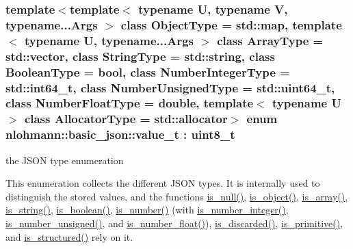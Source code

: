 \subsubsection[{value\+\_\+t}]{\setlength{\rightskip}{0pt plus 5cm}template$<$template$<$ typename U, typename V, typename...\+Args $>$ class Object\+Type = std\+::map, template$<$ typename U, typename...\+Args $>$ class Array\+Type = std\+::vector, class String\+Type  = std\+::string, class Boolean\+Type  = bool, class Number\+Integer\+Type  = std\+::int64\+\_\+t, class Number\+Unsigned\+Type  = std\+::uint64\+\_\+t, class Number\+Float\+Type  = double, template$<$ typename U $>$ class Allocator\+Type = std\+::allocator$>$ enum {\bf nlohmann\+::basic\+\_\+json\+::value\+\_\+t} \+: uint8\+\_\+t\hspace{0.3cm}{\ttfamily [strong]}}\label{classnlohmann_1_1basic__json_a231b02148577b69a154b2ce2c87a5522}


the J\+S\+O\+N type enumeration 

This enumeration collects the different J\+S\+O\+N types. It is internally used to distinguish the stored values, and the functions \hyperlink{classnlohmann_1_1basic__json_a685d9d6a8a45bfcb8455b147257cdffb}{is\+\_\+null()}, \hyperlink{classnlohmann_1_1basic__json_a0d96ff13001977a93d65f0a97279d316}{is\+\_\+object()}, \hyperlink{classnlohmann_1_1basic__json_a1af360cb513cc32f28e80ddd0b9d7666}{is\+\_\+array()}, \hyperlink{classnlohmann_1_1basic__json_ab22c8d61eca51f0308c263487bd35f03}{is\+\_\+string()}, \hyperlink{classnlohmann_1_1basic__json_a8f7e67d903f918cd08261219fb47a9f0}{is\+\_\+boolean()}, \hyperlink{classnlohmann_1_1basic__json_a1407f91b4689bbc56d1a3c401a5bb649}{is\+\_\+number()} (with \hyperlink{classnlohmann_1_1basic__json_a87499fdb56ca6f0df2242c3335c3dc9b}{is\+\_\+number\+\_\+integer()}, \hyperlink{classnlohmann_1_1basic__json_a693b411d9c5ad0d168a0013cfb80b8e5}{is\+\_\+number\+\_\+unsigned()}, and \hyperlink{classnlohmann_1_1basic__json_a628733b45cd0e32bd59efea149f40b4b}{is\+\_\+number\+\_\+float()}), \hyperlink{classnlohmann_1_1basic__json_a66c051561828b2c4eeaad896a72bec99}{is\+\_\+discarded()}, \hyperlink{classnlohmann_1_1basic__json_a7c774ef0eceff6d06095f617e2dbd488}{is\+\_\+primitive()}, and \hyperlink{classnlohmann_1_1basic__json_a558b345044c38a9f6ad522592cc700c8}{is\+\_\+structured()} rely on it.

